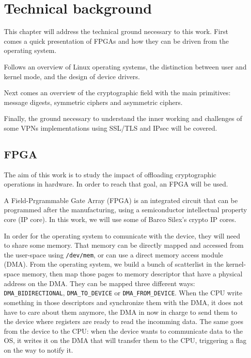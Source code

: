 \chapter{Technical background}\label{chap:theory}

This chapter will address the technical ground necessary to this work.
First comes a quick presentation of FPGAs and how they can be driven from the operating system.

\noindent Follows an overview of Linux operating systems, the distinction between user and kernel mode, and the design of device drivers.

\noindent Next comes an overview of the cryptographic field with the main primitives: message digests, symmetric ciphers and asymmetric ciphers.

\noindent Finally, the ground necessary to understand the inner working and challenges of some VPNs implementations using SSL/TLS and IPsec will be covered.



\section{FPGA}
The aim of this work is to study the impact of offloading cryptographic operations in hardware.
In order to reach that goal, an FPGA will be used.

A Field-Prgrammable Gate Array (FPGA) is an integrated circuit that can be programmed after the manufacturing, using a semiconductor intellectual property core (IP core).
In this work, we will use some of Barco Silex's crypto IP cores.

In order for the operating system to comunicate with the device, they will need to share some memory.
That memory can be directly mapped and accessed from the user-space using \texttt{/dev/mem}, or can use a direct memory access module (DMA).
From the operating system, we build a bunch of scatterlist in the kernel-space memory, then map those pages to memory descriptor that have a physical address on the DMA.
They can be mapped three different ways: \texttt{DMA\_BIDIRECTIONAL}, \texttt{DMA\_TO\_DEVICE} or \texttt{DMA\_FROM\_DEVICE}.
When the CPU write something in those descriptors and synchronize them with the DMA, it does not have to care about them anymore, the DMA in now in charge to send them to the device where registers are ready to read the incomming data.
The same goes from the device to the CPU: when the device wants to communicate data to the OS, it writes it on the DMA that will transfer them to the CPU, triggering a flag on the way to notify it.

